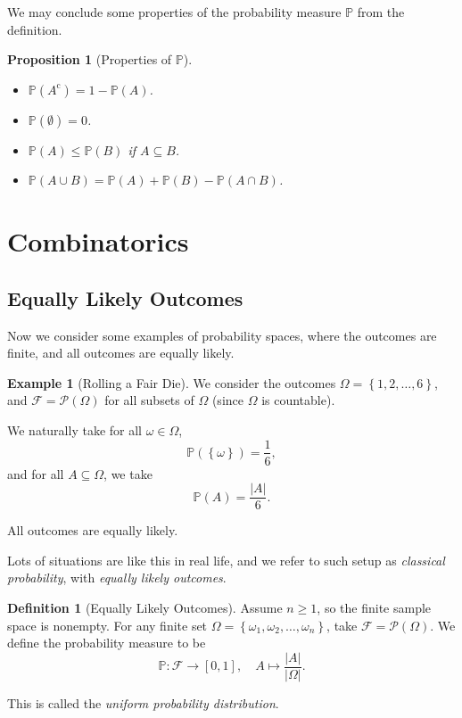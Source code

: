 \documentclass[11pt]{article}
\numberwithin{equation}{section}
\newtheorem{proposition}[theorem]{Proposition}
\theoremstyle{definition}
\newtheorem{definition}[theorem]{Definition}
\newtheorem{example}[theorem]{Example}
\theoremstyle{remark}
\newcommand{\pqty}[1]{\left(#1\right)}
\newcommand{\Bqty}[1]{\left\{#1\right\}}
\newcommand{\abs}[1]{\left|#1\right|}
\newcommand{\ccintv}[2]{[#1,#2]}
\newcommand{\function}[5]{#1:#2\to #3,\quad #4\mapsto #5}
\newcommand{\compl}{^{\mathrm c}}
\newcommand{\powerset}{\mathcal P}
\newcommand{\eventSpace}{\mathcal F}
\newcommand{\Prob}{\mathbb P}
\begin{document}
We may conclude some properties of the probability measure \(\Prob\) from the definition.

\begin{proposition}[Properties of \(\Prob\)]\label{probability-proposition-001}
    \label{probability-prop:properties-prob}%
    \begin{itemize}
        \item \(\Prob\pqty{A\compl} = 1 - \Prob\pqty{A}\).
        \item \(\Prob\pqty{\emptyset} = 0\).
        \item \(\Prob\pqty{A} \leq \Prob\pqty{B}\) if \(A \subseteq B\).
        \item \(\Prob\pqty{A \cup B} = \Prob\pqty{A} + \Prob\pqty{B} - \Prob\pqty{A \cap B}\).
    \end{itemize}
\end{proposition}

\section{Combinatorics}\label{probability-section-02}

\subsection{Equally Likely Outcomes}
Now we consider some examples of probability spaces, where the outcomes are finite, and all outcomes are equally likely.

\begin{example}[Rolling a Fair Die]\label{probability-example-001}
    \label{probability-ex:rolling-a-fair-die}%
    We consider the outcomes \(\Omega = \Bqty{1, 2, \ldots, 6}\), and \(\eventSpace = \powerset\pqty{\Omega}\) for all subsets of \(\Omega\) (since \(\Omega\) is countable).
        
    We naturally take for all \(\omega \in \Omega\),
    \[
        \Prob\pqty{\Bqty{\omega}} = \frac{1}{6},
    \]
    and for all \(A \subseteq \Omega\), we take
    \[
        \Prob\pqty{A} = \frac{\abs{A}}{6}.
    \]

    All outcomes are equally likely.
\end{example}

Lots of situations are like this in real life, and we refer to such setup as \emph{classical probability}, with \emph{equally likely outcomes}.

\begin{definition}[Equally Likely Outcomes]\label{probability-definition-005}
    \label{probability-def:equally-likely-outcomes}
Assume \(n\ge1\), so the finite sample space is nonempty.
%
    For any finite set \(\Omega = \Bqty{\omega_1, \omega_2, \ldots, \omega_n}\), take \(\eventSpace = \powerset\pqty{\Omega}\). We define the probability measure to be
    \[
        \function{\Prob}{\eventSpace}{\ccintv{0}{1}}{A}{\frac{\abs{A}}{\abs{\Omega}}.}
    \]

    This is called the \emph{uniform probability distribution}.
\end{definition}
\end{document}
